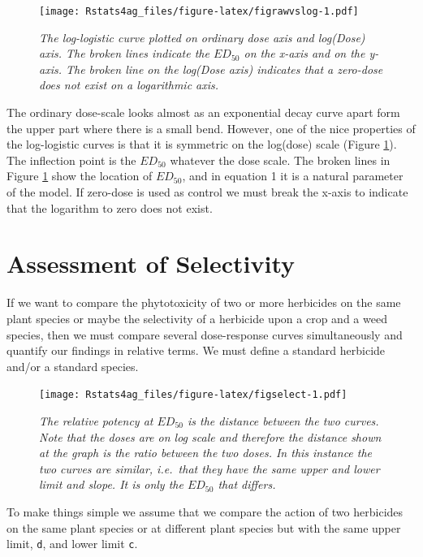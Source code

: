 \documentclass[letterpaper,]{book}
\begin{document}
\begin{figure}
\centering
\texttt{[image: Rstats4ag\_files/figure-latex/figrawvslog-1.pdf]}
\caption{\label{fig:figrawvslog}\emph{The log-logistic curve plotted on ordinary dose axis and log(Dose) axis. The broken lines indicate the \(ED_{50}\) on the x-axis and on the y-axis. The broken line on the log(Dose axis) indicates that a zero-dose does not exist on a logarithmic axis.}}
\end{figure}

The ordinary dose-scale looks almost as an exponential decay curve apart form the upper part where there is a small bend. However, one of the nice properties of the log-logistic curves is that it is symmetric on the log(dose) scale (Figure \ref{fig:figrawvslog}). The inflection point is the \(ED_{50}\) whatever the dose scale. The broken lines in Figure \ref{fig:figrawvslog} show the location of \(ED_{50}\), and in equation 1 it is a natural parameter of the model. If zero-dose is used as control we must break the x-axis to indicate that the logarithm to zero does not exist.

\hypertarget{assessment-of-selectivity}{%
\section{Assessment of Selectivity}\label{assessment-of-selectivity}}

If we want to compare the phytotoxicity of two or more herbicides on the same plant species or maybe the selectivity of a herbicide upon a crop and a weed species, then we must compare several dose-response curves simultaneously and quantify our findings in relative terms. We must define a standard herbicide and/or a standard species.



\begin{figure}
\centering
\texttt{[image: Rstats4ag\_files/figure-latex/figselect-1.pdf]}
\caption{\label{fig:figselect}\emph{The relative potency at \(ED_{50}\) is the distance between the two curves. Note that the doses are on log scale and therefore the distance shown at the graph is the ratio between the two doses. In this instance the two curves are similar, i.e.~that they have the same upper and lower limit and slope. It is only the \(ED_{50}\) that differs.}}
\end{figure}

To make things simple we assume that we compare the action of two herbicides on the same plant species or at different plant species but with the same upper limit, \texttt{d}, and lower limit \texttt{c}.
\end{document}
